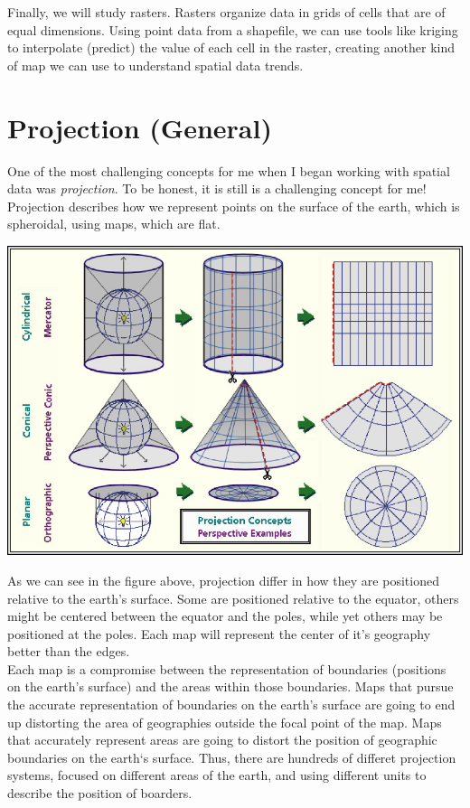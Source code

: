 \documentclass[
]{book}
\begin{document}
Finally, we will study rasters. Rasters organize data in grids of cells that are of equal dimensions. Using point data from a shapefile, we can use tools like kriging to interpolate (predict) the value of each cell in the raster, creating another kind of map we can use to understand spatial data trends.

\hypertarget{projection-general}{%
\section{Projection (General)}\label{projection-general}}

One of the most challenging concepts for me when I began working with spatial data was \emph{projection}. To be honest, it is still is a challenging concept for me! Projection describes how we represent points on the surface of the earth, which is spheroidal, using maps, which are flat.

\includegraphics{data-unit-12/images/437-mapping-projection-types.png}

As we can see in the figure above, projection differ in how they are positioned relative to the earth's surface. Some are positioned relative to the equator, others might be centered between the equator and the poles, while yet others may be positioned at the poles. Each map will represent the center of it's geography better than the edges.\\
Each map is a compromise between the representation of boundaries (positions on the earth's surface) and the areas within those boundaries. Maps that pursue the accurate representation of boundaries on the earth's surface are going to end up distorting the area of geographies outside the focal point of the map. Maps that accurately represent areas are going to distort the position of geographic boundaries on the earth`s surface. Thus, there are hundreds of differet projection systems, focused on different areas of the earth, and using different units to describe the position of boarders.
\end{document}
